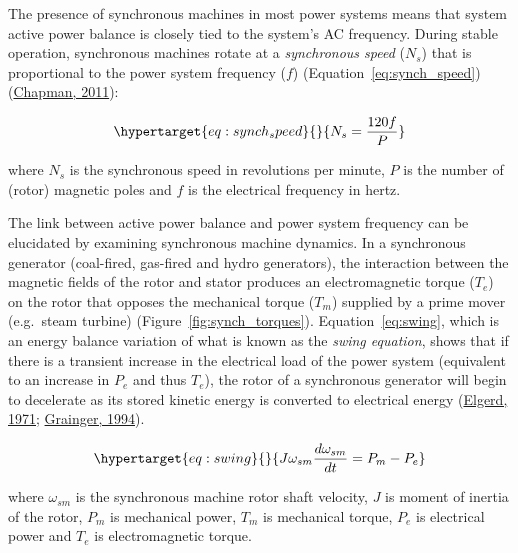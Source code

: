 \documentclass[12pt,a4paper,]{report}
\begin{document}
The presence of synchronous machines in most power systems means that
system active power balance is closely tied to the system's AC
frequency. During stable operation, synchronous machines rotate at a
\emph{synchronous speed} (\(N_s\)) that is proportional to the power
system frequency (\(f\)) (Equation~\ref{eq:synch_speed})
(\protect\hyperlink{ref-chapmanElectricMachineryFundamentals2011}{Chapman,
2011}):

\begin{equation}\protect\hypertarget{eq:synch_speed}{}{N_s = \frac{120f}{P}}\label{eq:synch_speed}\end{equation}

where \(N_s\) is the synchronous speed in revolutions per minute, \(P\)
is the number of (rotor) magnetic poles and \(f\) is the electrical
frequency in hertz.

The link between active power balance and power system frequency can be
elucidated by examining synchronous machine dynamics. In a synchronous
generator (coal-fired, gas-fired and hydro generators), the interaction
between the magnetic fields of the rotor and stator produces an
electromagnetic torque (\(T_e\)) on the rotor that opposes the
mechanical torque (\(T_m\)) supplied by a prime mover (e.g.~steam
turbine) (Figure~\ref{fig:synch_torques}). Equation~\ref{eq:swing},
which is an energy balance variation of what is known as the \emph{swing
equation}, shows that if there is a transient increase in the electrical
load of the power system (equivalent to an increase in \(P_e\) and thus
\(T_e\)), the rotor of a synchronous generator will begin to decelerate
as its stored kinetic energy is converted to electrical energy
(\protect\hyperlink{ref-elgerdElectricEnergySystems1971}{Elgerd, 1971};
\protect\hyperlink{ref-graingerPowerSystemAnalysis1994}{Grainger,
1994}).

\begin{equation}\protect\hypertarget{eq:swing}{}{J\omega_{sm}\frac{d\omega_{sm}}{dt} = P_m - P_e}\label{eq:swing}\end{equation}

where \(\omega_{sm}\) is the synchronous machine rotor shaft velocity,
\(J\) is moment of inertia of the rotor, \(P_m\) is mechanical power,
\(T_m\) is mechanical torque, \(P_e\) is electrical power and \(T_e\) is
electromagnetic torque.
\end{document}
